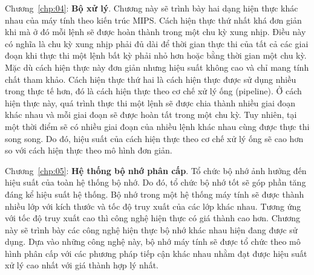 Chương~\ref{chp:04}: \textbf{Bộ xử lý}. Chương này sẽ trình bày hai dạng hiện thực khác nhau của máy tính theo kiến trúc MIPS. Cách hiện thực thứ nhất khá đơn giản khi mà ở đó mỗi lệnh sẽ được hoàn thành trong một chu kỳ xung nhịp. Điều này có nghĩa là chu kỳ xung nhịp phải đủ dài để thời gian thực thi của tất cả các giai đoạn khi thực thi một lệnh bất kỳ phải nhỏ hơn hoặc bằng thời gian một chu kỳ. Mặc dù cách hiện thực này đơn giản nhưng hiệu suất không cao và chỉ mang tính chất tham khảo. Cách hiện thực thứ hai là cách hiện thực được sử dụng nhiều trong thực tế hơn, đó là cách hiện thực theo cơ chế xử lý ống (pipeline). Ở cách hiện thực này, quá trình thực thi một lệnh sẽ được chia thành nhiều giai đoạn khác nhau và mỗi giai đoạn sẽ được hoàn tất trong một chu kỳ. Tuy nhiên, tại một thời điểm sẽ có nhiều giai đoạn của nhiều lệnh khác nhau cùng được thực thi song song. Do đó, hiệu suất của cách hiện thực theo cơ chế xử lý ống sẽ cao hơn so với cách hiện thực theo mô hình đơn giản.

Chương~\ref{chp:05}: \textbf{Hệ thống bộ nhớ phân cấp}. Tổ chức bộ nhớ ảnh hưởng đến hiệu suất của toàn hệ thống bộ nhớ. Do đó, tổ chức bộ nhớ tốt sẽ góp phần tăng đáng kể hiệu suất hệ thống. Bộ nhớ trong một hệ thống máy tính sẽ được thành nhiều lớp với kích thước và tốc độ truy xuất của các lớp khác nhau. Tương ứng với tốc độ truy xuất cao thì công nghệ hiện thực có giá thành cao hơn. Chương này sẽ trình bày các công nghệ hiện thực bộ nhớ khác nhau hiện đang được sử dụng. Dựa vào những công nghệ này, bộ nhớ máy tính sẽ được tổ chức theo mô hình phân cấp với các phương pháp tiếp cận khác nhau nhằm đạt được hiệu suất xử lý cao nhất với giá thành hợp lý nhất.


